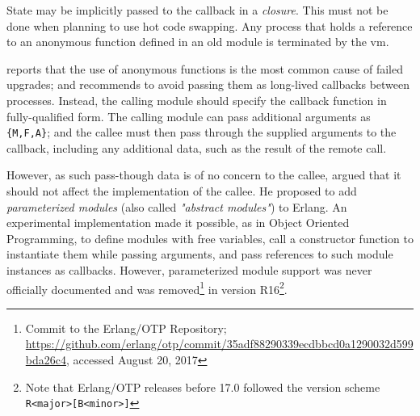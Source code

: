 State may be implicitly passed to the callback in a \emph{closure}. This must not be done when planning to use hot code swapping. Any process that holds a reference to an anonymous function defined in an old module is terminated by the \acrshort{vm}.

\cite{davis:talk} reports that the use of anonymous functions is the most common cause of failed upgrades; and recommends to avoid passing them as long-lived callbacks between processes. Instead, the calling module should specify the callback function in fully-qualified form. The calling module can pass additional arguments as \lstinline|{M,F,A}|; and the callee must then pass through the supplied arguments to the callback, including any additional data, such as the result of the remote call.

However, as such pass-though data is of no concern to the callee, \cite{carlsson:parameterized} argued that it should not affect the implementation of the callee. He proposed to add \emph{parameterized modules} (also called \emph{"abstract modules"}) to Erlang. An experimental implementation made it possible, as in Object Oriented Programming, to define modules with free variables, call a constructor function to instantiate them while passing arguments, and pass references to such module instances as callbacks.
However, parameterized module support was never officially documented and was removed\footnote{Commit to the Erlang/OTP Repository; \url{https://github.com/erlang/otp/commit/35adf88290339ecdbbcd0a1290032d599bda26c4}, accessed August 20, 2017} in version R16\footnote{Note that Erlang/OTP releases before 17.0 followed the version scheme \lstinline|R<major>[B<minor>]|}.
